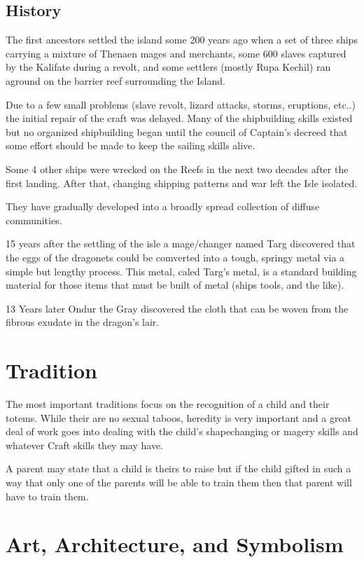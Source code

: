 \subsection{History}

The first ancestors settled the island some 200 years ago when a set of 
three ships carrying a mixture of Thenaen mages and merchants, some 600 
slaves captured by the Kalifate during a revolt, and some settlers (mostly 
Rupa Kechil) ran aground on the barrier reef surrounding the Island.

Due to a few small problems (slave revolt, lizard attacks, storms, eruptions, etc..) 
the initial repair of the craft was delayed. Many of the shipbuilding skills 
existed but no organized shipbuilding began until the council of Captain's decreed 
that some effort should be made to keep the sailing skills alive. 

Some 4 other ships were wrecked on the Reefs in the next two decades
after the first landing. After that, changing shipping patterns and war
left the Isle isolated. 

They have gradually developed into a broadly spread collection of 
diffuse communities. 

15 years after the settling of the isle a mage/changer named Targ discovered 
that the eggs of
the dragonets could be comverted into a tough, springy metal via a simple but 
lengthy process.
This metal, caled Targ's metal, is a standard building material for those items 
that must be 
built of metal (ships tools, and the like).

13 Years later Ondur the Gray discovered the cloth that can be woven from 
the fibrous exudate in the dragon's lair.

\section{Tradition}

The most important traditions focus on the recognition of a child and their totems.
While their are no sexual taboos, heredity is very important and a great deal of work 
goes into dealing with the child's shapechanging or magery skills and whatever
Craft skills they may have. 

A parent may state that a child is theirs to raise but if the child gifted in
such a way that only one of the parents will be able to train them then that parent
will have to train them. 

\section{Art, Architecture, and Symbolism}

